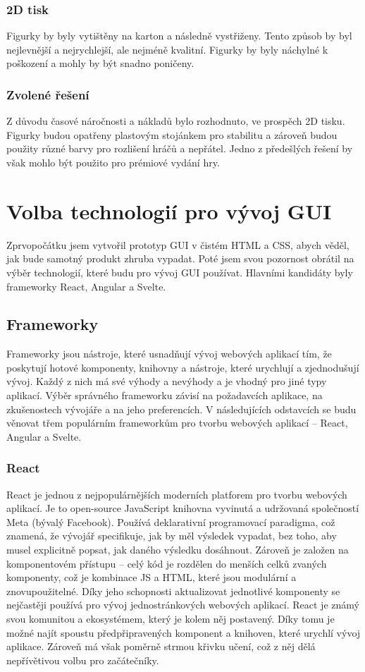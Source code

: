 \subsubsection*{2D tisk}
Figurky by byly vytištěny na karton a následně vystřiženy. Tento způsob by byl nejlevnější a nejrychlejší, ale nejméně kvalitní. Figurky by byly náchylné k poškození a mohly by být snadno poničeny.

\subsubsection*{Zvolené řešení}
Z důvodu časové náročnosti a nákladů bylo rozhodnuto, ve prospěch 2D tisku. Figurky budou opatřeny plastovým stojánkem pro stabilitu a zároveň budou použity různé barvy pro rozlišení hráčů a nepřátel. Jedno z předešlých řešení by však mohlo být použito pro prémiové vydání hry.

\section{Volba technologií pro vývoj GUI}
Zprvopočátku jsem vytvořil prototyp GUI v čistém HTML a CSS, abych věděl, jak bude samotný produkt zhruba vypadat. Poté jsem svou pozornost obrátil na výběr technologií, které budu pro vývoj GUI používat. Hlavními kandidáty byly frameworky React, Angular a Svelte.

\subsection{Frameworky}
Frameworky jsou nástroje, které usnadňují vývoj webových aplikací tím, že poskytují hotové komponenty, knihovny a nástroje, které urychlují a zjednodušují vývoj. Každý z nich má své výhody a nevýhody a je vhodný pro jiné typy aplikací. Výběr správného frameworku závisí na požadavcích aplikace, na zkušenostech vývojáře a na jeho preferencích. V následujících odstavcích se budu věnovat třem populárním frameworkům pro tvorbu webových aplikací -- React, Angular a Svelte.

\subsubsection*{React}
React je jednou z nejpopulárnějších moderních platforem pro tvorbu webových aplikací. Je to open-source JavaScript knihovna vyvinutá a udržovaná společností Meta (bývalý Facebook). Používá deklarativní programovací paradigma, což znamená, že vývojář specifikuje, jak by měl výsledek vypadat, bez toho, aby musel explicitně popsat, jak daného výsledku dosáhnout. Zároveň je založen na komponentovém přístupu -- celý kód je rozdělen do menších celků zvaných komponenty, což je kombinace JS a HTML, které jsou modulární a znovupoužitelné. Díky jeho schopnosti aktualizovat jednotlivé komponenty se nejčastěji používá pro vývoj jednostránkových webových aplikací. React je známý svou komunitou a ekosystémem, který je kolem něj postavený. Díky tomu je možné najít spoustu předpřipravených komponent a knihoven, které urychlí vývoj aplikace. Zároveň má však poměrně strmou křivku učení, což z něj dělá nepřívětivou volbu pro začátečníky.

